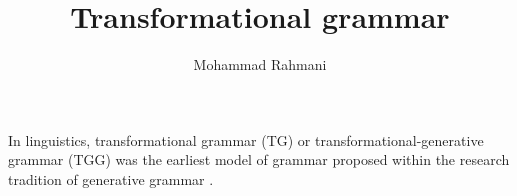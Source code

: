 \documentclass[a4paper]{article}
\title{Transformational grammar}
\date{}
\author{Mohammad Rahmani}
\begin{document}
\maketitle
    In linguistics, transformational grammar (TG) or transformational-generative grammar (TGG) was the earliest model of grammar proposed within the research tradition of generative grammar .
    
    
\end{document}
